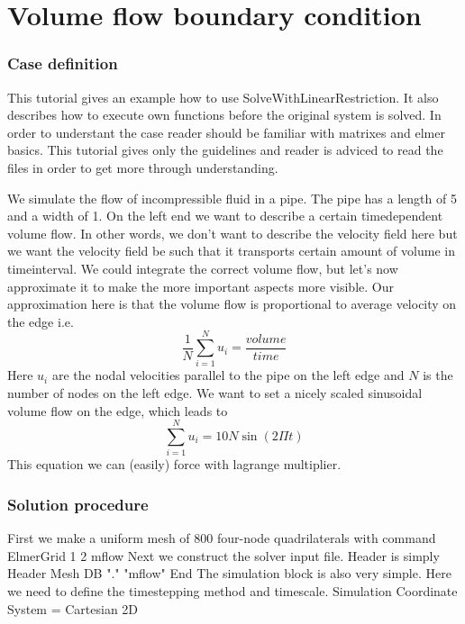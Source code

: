 \chapter{Volume flow boundary condition}


\subsection*{Case definition}

This tutorial gives an example how to use SolveWithLinearRestriction. It also describes
how to execute own functions before the original system is solved. In order to
understant the case reader should be familiar with  matrixes and
elmer basics. This tutorial gives only the guidelines and reader is adviced to
read the files in order to get more through understanding.

We simulate the flow of incompressible fluid in a pipe.
The pipe has a length of 5 and a width of 1. On the left end we want to describe
a certain timedependent volume flow. In other words, we don't want to describe the velocity field
here but we want the velocity field be such that it transports certain amount of volume
in timeinterval. We could integrate the correct volume flow, but let's now approximate it
to make the more important aspects more visible. Our approximation here is that the volume
flow is proportional to average velocity on the edge i.e.
\begin{equation}
\frac{1}{N}\sum_{i=1}^{N}u_i = \frac{volume}{time}
\end{equation}
Here $u_i$ are the nodal velocities parallel to the pipe on the left edge and $N$ is the number of nodes on
the left edge. We want to set a nicely scaled sinusoidal volume flow on the edge, which leads to
\begin{equation}
\sum_{i=1}^{N}u_i = 10N\sin(2\Pi t)
\end{equation}
This equation we can (easily) force with lagrange multiplier.

\subsection*{Solution procedure}
First we make a uniform mesh of 800 four-node quadrilaterals with command
\ttbegin
ElmerGrid 1 2 mflow
\ttend
Next we construct the solver input file. Header is simply
\ttbegin
Header
  Mesh DB "." "mflow"
End
\ttend
The simulation block is also very simple. 
Here we need to define the timestepping method and timescale.
\ttbegin
Simulation
  Coordinate System = Cartesian 2D

